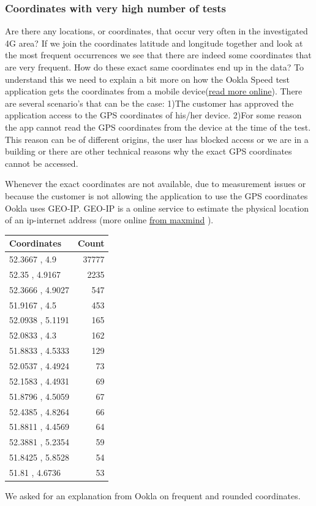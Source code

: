 \documentclass[]{article}
\begin{document}
\subsubsection{Coordinates with very high number of
tests}\label{coordinates-with-very-high-number-of-tests}

Are there any locations, or coordinates, that occur very often in the
investigated 4G area? If we join the coordinates latitude and longitude
together and look at the most frequent occurrences we see that there are
indeed some coordinates that are very frequent. How do these exact same
coordinates end up in the data? To understand this we need to explain a
bit more on how the Ookla Speed test application gets the coordinates
from a mobile
device(\href{https://support.speedtest.net/hc/en-us/articles/203845480-Mobile-Test-Server-Selection}{read
more online}). There are several scenario's that can be the case: 1)The
customer has approved the application access to the GPS coordinates of
his/her device. 2)For some reason the app cannot read the GPS
coordinates from the device at the time of the test. This reason can be
of different origins, the user has blocked access or we are in a
building or there are other technical reasons why the exact GPS
coordinates cannot be accessed.

Whenever the exact coordinates are not available, due to measurement
issues or because the customer is not allowing the application to use
the GPS coordinates Ookla uses GEO-IP. GEO-IP is a online service to
estimate the physical location of an ip-internet address (more online
\href{https://www.maxmind.com/en/geoip2-services-and-databases}{from
maxmind} ).

\begin{longtable}[c]{@{}lr@{}}
\toprule
Coordinates & Count\tabularnewline
\midrule
\endhead
52.3667 , 4.9 & 37777\tabularnewline
52.35 , 4.9167 & 2235\tabularnewline
52.3666 , 4.9027 & 547\tabularnewline
51.9167 , 4.5 & 453\tabularnewline
52.0938 , 5.1191 & 165\tabularnewline
52.0833 , 4.3 & 162\tabularnewline
51.8833 , 4.5333 & 129\tabularnewline
52.0537 , 4.4924 & 73\tabularnewline
52.1583 , 4.4931 & 69\tabularnewline
51.8796 , 4.5059 & 67\tabularnewline
52.4385 , 4.8264 & 66\tabularnewline
51.8811 , 4.4569 & 64\tabularnewline
52.3881 , 5.2354 & 59\tabularnewline
51.8425 , 5.8528 & 54\tabularnewline
51.81 , 4.6736 & 53\tabularnewline
\bottomrule
\end{longtable}

We asked for an explanation from Ookla on frequent and rounded
coordinates.
\end{document}
